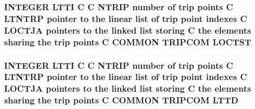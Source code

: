\hypertarget{msa20_2home_2abonfi_2_c_f_d__codes_2_eul_f_s_83_82_83_2include_2trip_8com_a1da3a79d56d60efb2ec802079caef607}{
\subsubsection[{L\-O\-C\-T\-S\-T}]{\setlength{\rightskip}{0pt plus 5cm}I\-N\-T\-E\-G\-E\-R L\-T\-T\-I C C {\bf N\-T\-R\-I\-P} number of trip points C L\-T\-N\-T\-R\-P pointer to the linear list of trip point indexes C {\bf L\-O\-C\-T\-J\-A} pointers to the linked list storing C the elements sharing the trip points C C\-O\-M\-M\-O\-N T\-R\-I\-P\-C\-O\-M L\-O\-C\-T\-S\-T}}\label{msa20_2home_2abonfi_2_c_f_d__codes_2_eul_f_s_83_82_83_2include_2trip_8com_a1da3a79d56d60efb2ec802079caef607}
\hypertarget{msa20_2home_2abonfi_2_c_f_d__codes_2_eul_f_s_83_82_83_2include_2trip_8com_a0d4fc998108c0f869ce087a3b54bdca6}{
\subsubsection[{L\-T\-T\-D}]{\setlength{\rightskip}{0pt plus 5cm}I\-N\-T\-E\-G\-E\-R L\-T\-T\-I C C {\bf N\-T\-R\-I\-P} number of trip points C L\-T\-N\-T\-R\-P pointer to the linear list of trip point indexes C {\bf L\-O\-C\-T\-J\-A} pointers to the linked list storing C the elements sharing the trip points C C\-O\-M\-M\-O\-N T\-R\-I\-P\-C\-O\-M L\-T\-T\-D}}\label{msa20_2home_2abonfi_2_c_f_d__codes_2_eul_f_s_83_82_83_2include_2trip_8com_a0d4fc998108c0f869ce087a3b54bdca6}
